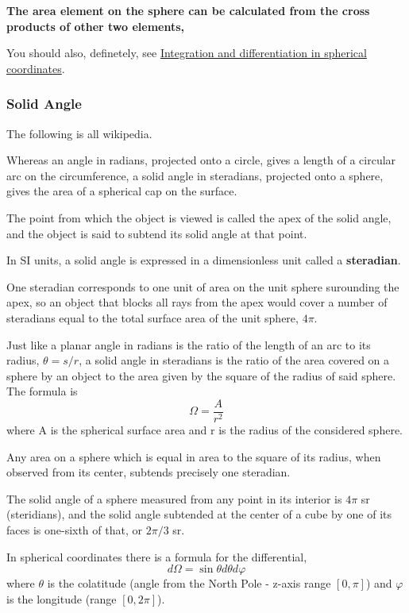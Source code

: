 \textbf{The area element on the sphere can be calculated from the cross products of other two elements,}

You should also, definetely, see
\href{https://en.wikipedia.org/wiki/Spherical_coordinate_system#Integration_and_differentiation_in_spherical_coordinates}{Integration and differentiation in spherical coordinates}.



\subsubsection{Solid Angle}

The following is all wikipedia.

Whereas an angle in radians, projected onto a circle, gives a length of a circular arc
on the circumference, a solid angle in steradians, projected onto a sphere,
gives the area of a spherical cap on the surface.

The point from which the object is viewed is called the apex of the solid angle,
and the object is said to subtend its solid angle at that point.

In SI units, a solid angle is expressed in a dimensionless unit called a \textbf{steradian}.

One steradian corresponds to one unit of area on the unit sphere surounding the apex,
so an object that blocks all rays from the apex would cover a number of steradians equal
to the total surface area of the unit sphere, $4\pi$.


Just like a planar angle in radians is the ratio of the length of an arc to its radius, $\theta = s/r$,
a solid angle in steradians is the ratio of the area covered on a sphere by an object to the area given
by the square of the radius of said sphere. The formula is
$$
\Omega = \frac{A}{r^2}
$$
where A is the spherical surface area and r is the radius of the considered sphere.

Any area on a sphere which is equal in area to the square of its radius,
when observed from its center, subtends precisely one steradian.

The solid angle of a sphere measured from any point in its interior is $4\pi$ sr (steridians),
and the solid angle subtended at the center of a cube by one of its faces is one-sixth of that,
or $2\pi/3$ sr.

In spherical coordinates there is a formula for the differential,
$$
d\Omega = \sin \theta d\theta d\varphi 
$$
where $\theta$ is the colatitude (angle from the North Pole - z-axis range $[0,\pi]$)
and $\varphi$ is the longitude (range $[0,2\pi]$).

